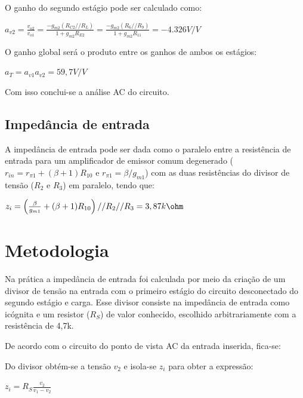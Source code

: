 O ganho do segundo estágio pode ser calculado como:

\begin{center}
     $a_{v2} = \frac{v_{o2}}{v_{o1}} = \frac{-g_{m2}(R_{C2}//R_{L})}{1+g_{m2}R_{E2}} = \frac{-g_{m2}(R_6//R_9)}{1+g_{m2}R_{11}} = -4.326 V/V$
\end{center}

O ganho global será o produto entre os ganhos de ambos os estágios:

\begin{center}
     $a_{T} = a_{v1}a_{v2} = 59,7 V/V$
\end{center}

Com isso conclui-se a análise AC do circuito.

\subsection{Impedância de entrada}

A impedância de entrada pode ser dada como o paralelo entre a resistência de entrada para um amplificador de emissor comum degenerado ($r_{in} = r_{\pi1}+(\beta +1)R_{10}$ e $r_{\pi1}=\beta / g_{m1}$) com as duas resistências do divisor de tensão ($R_2$ e $R_3$) em paralelo, tendo que:

\begin{center}
     $z_{i} = \left(\frac{\beta}{g_{m1}}+(\beta +1)R_{10} \right)//R_2//R_3 = 3,87k\ohm$
\end{center}

\section{Metodologia}

Na prática a impedância de entrada foi calculada por meio da criação de um divisor de tensão na entrada com o primeiro estágio do circuito desconectado do segundo estágio e carga. Esse divisor consiste na impedância de entrada como icógnita e um resistor ($R_S$) de valor conhecido, escolhido arbitrariamente com a resistência de 4,7k\ohm.

De acordo com o circuito do ponto de vista AC da entrada inserida, fica-se:



Do divisor obtém-se a tensão $v_2$ e isola-se $z_i$ para obter a expressão:

\begin{center}
     $ z_{i} = R_S\frac{v_2}{v_1-v_2}$
\end{center}

